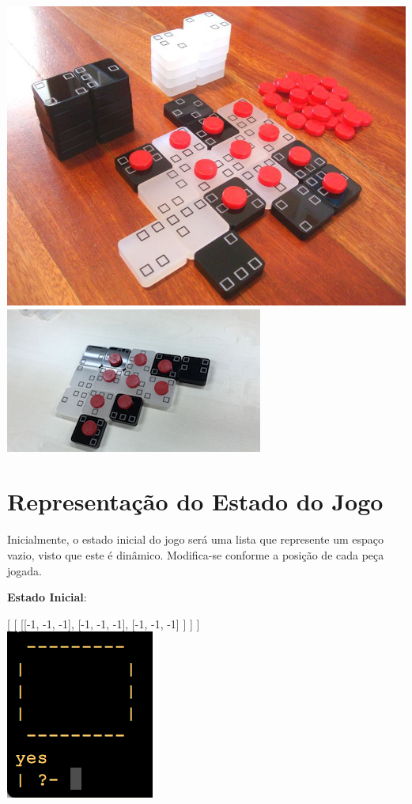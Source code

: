 \documentclass[a4paper]{article}
\begin{document}
\includegraphics[scale=0.3]{../printscreens/niju.jpg} \linebreak
\includegraphics[scale=0.5]{../printscreens/niju2.png} \linebreak




\section{Representação do Estado do Jogo}

Inicialmente, o estado inicial do jogo será uma lista que represente um espaço vazio, visto que este é dinâmico. Modifica-se conforme a posição de cada peça jogada.

\textbf{Estado Inicial}:

[
  [
      [[-1, -1, -1],
		  [-1, -1, -1],
		  [-1, -1, -1]
		 ]
                      ]
	                 ]\linebreak\linebreak\\

\includegraphics[scale=0.8]{../printscreens/initial_board.png} \linebreak
\end{document}
